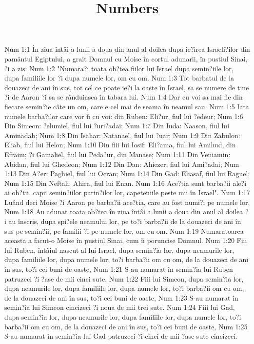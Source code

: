 

\title{Numbers}

Num 1:1  În ziua întâi a lunii a doua din anul al doilea dupa ie?irea Israeli?ilor din pamântul Egiptului, a grait Domnul cu Moise în cortul adunarii, în pustiul Sinai, ?i a zis:
Num 1:2  "Numara?i toata ob?tea fiilor lui Israel dupa semin?iile lor, dupa familiile lor ?i dupa numele lor, om cu om.
Num 1:3  Tot barbatul de la douazeci de ani în sus, tot cel ce poate ie?i la oaste în Israel, sa se numere de tine ?i de Aaron ?i sa se rânduiasca în tabara lui.
Num 1:4  Dar cu voi sa mai fie din fiecare semin?ie câte un om, care e cel mai de seama în neamul sau.
Num 1:5  Iata numele barba?ilor care vor fi cu voi: din Ruben: Eli?ur, fiul lui ?edeur;
Num 1:6  Din Simeon: ?elumiel, fiul lui ?uri?adai;
Num 1:7  Din Iuda: Naason, fiul lui Aminadab;
Num 1:8  Din Isahar: Natanael, fiul lui ?uar;
Num 1:9  Din Zabulon: Eliab, fiul lui Helon;
Num 1:10  Din fiii lui Iosif: Eli?ama, fiul lui Amihud, din Efraim; ?i Gamaliel, fiul lui Peda?ur, din Manase;
Num 1:11  Din Veniamin: Abidan, fiul lui Ghedeon;
Num 1:12  Din Dan: Ahiezer, fiul lui Ami?adai;
Num 1:13  Din A?er: Paghiel, fiul lui Ocran;
Num 1:14  Din Gad: Eliasaf, fiul lui Raguel;
Num 1:15  Din Neftali: Ahira, fiul lui Enan.
Num 1:16  Ace?tia sunt barba?ii ale?i ai ob?tii, capii semin?iilor parin?ilor lor, capeteniile peste mii în Israel".
Num 1:17  Luând deci Moise ?i Aaron pe barba?ii ace?tia, care au fost numi?i pe numele lor,
Num 1:18  Au adunat toata ob?tea în ziua întâi a lunii a doua din anul al doilea ?i au înscris, dupa spi?ele neamului lor, pe to?i barba?ii de la douazeci de ani în sus pe semin?ii, pe familii ?i pe numele lor, om cu om.
Num 1:19  Numaratoarea aceasta a facut-o Moise în pustiul Sinai, cum îi poruncise Domnul.
Num 1:20  Fiii lui Ruben, întâiul nascut al lui Israel, dupa semin?ia lor, dupa neamurile lor, dupa familiile lor, dupa numele lor, to?i barba?ii om cu om, de la douazeci de ani în sus, to?i cei buni de oaste,
Num 1:21  S-au numarat în semin?ia lui Ruben patruzeci ?i ?ase de mii cinci sute.
Num 1:22  Fiii lui Simeon, dupa semin?ia lor, dupa neamurile lor, dupa familiile lor, dupa numele lor, to?i barba?ii om cu om, de la douazeci de ani în sus, to?i cei buni de oaste,
Num 1:23  S-au numarat în semin?ia lui Simeon cincizeci ?i noua de mii trei sute.
Num 1:24  Fiii lui Gad, dupa semin?ia lor, dupa neamurile lor, dupa familiile lor, dupa numele lor, to?i barba?ii om cu om, de la douazeci de ani în sus, to?i cei buni de oaste,
Num 1:25  S-au numarat în semin?ia lui Gad patruzeci ?i cinci de mii ?ase sute cincizeci.
